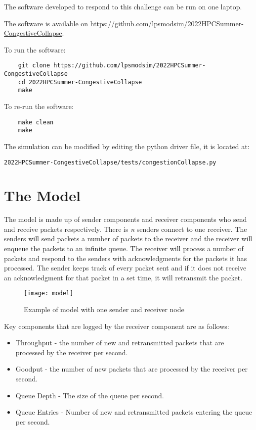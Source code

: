 \documentclass{article}
\begin{document}
The software developed to respond to this challenge can be run on one laptop.

\noindent The software is available on \href{https://github.com/lpsmodsim/2022HPCSummer-CongestiveCollapse}{https://github.com/lpsmodsim/2022HPCSummer-CongestiveCollapse}.\newline

\noindent To run the software:

\begin{verbatim}
	git clone https://github.com/lpsmodsim/2022HPCSummer-CongestiveCollapse
	cd 2022HPCSummer-CongestiveCollapse
	make
\end{verbatim}

\noindent To re-run the software:

\begin{verbatim}
	make clean
	make
\end{verbatim}

\noindent The simulation can be modified by editing the python driver file, it is located at:

\begin{verbatim}
2022HPCSummer-CongestiveCollapse/tests/congestionCollapse.py
\end{verbatim}

\section{The Model}

The model is made up of sender components and receiver components who send and receive packets respectively. There is \textit{n} senders connect to one receiver. The senders will send packets a number of packets to the receiver and the receiver will enqueue the packets to an infinite queue. The receiver will process a number of packets and respond to the senders with acknowledgments for the packets it has processed. The sender keeps track of every packet sent and if it does not receive an acknowledgment for that packet in a set time, it will retransmit the packet.

\begin{figure}[H]
	\texttt{[image: model]}
	\centering
	\caption{Example of model with one sender and receiver node}
\end{figure}

Key components that are logged by the receiver component are as follows:

\begin{itemize}
	\item Throughput - the number of new and retransmitted packets that are processed by the receiver per second.
	\item Goodput - the number of new packets that are processed by the receiver per second.
	\item Queue Depth - The size of the queue per second.
	\item Queue Entries - Number of new and retransmitted packets entering the queue per second.
\end{itemize}
\end{document}
